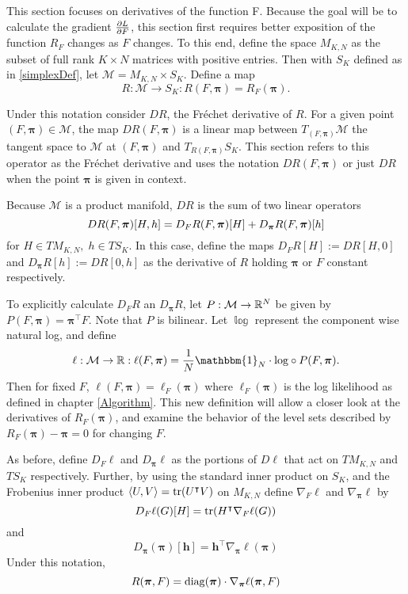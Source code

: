\label{sect:dRdPiANDdRdF}
This section focuses on derivatives of the function \Rpi F. Because the goal will be to calculate the gradient \( \pdv{L}{F} \), this section first requires better exposition of the function \( R_F \) changes as \( F \) changes. To this end, define the space $M_{K,N}$ as the subset of full rank $K\times N$ matrices with positive entries.  Then with $S_K$ defined as in \ref{simplexDef}, let $\mathcal{M}=M_{K,N}\times S_K$. Define a map
\begin{equation}\label{manifoldResp}
R:\mathcal{M}\rightarrow S_K:R(F,\bm\pi) = R_F(\bm\pi).
\end{equation}

Under this notation consider $DR$, the Fr\'{e}chet derivative of $R$.  For a given point $(F,\bm\pi)\in \mathcal{M}$, the map $DR(F,\bm\pi)$ is a linear map between $T_{(F,\bm\pi)}\mathcal{M}$ the tangent space to $\mathcal{M}$ at $(F,\bm\pi)$ and $T_{R(F,\bm\pi)}S_K$.  This section refers to this operator as the Fr\'{e}chet derivative and uses the notation $DR(F,\bm\pi)$ or just $DR$ when the point \( \bm\pi \) is given in context.

Because $\mathcal{M}$ is a product manifold, $DR$ is the sum of two linear operators
\begin{equation*}
DR(F,\bm\pi)[H,h] = D_FR(F,\bm\pi)[H] + D_{\bm\pi}R(F,\bm\pi)[h]  \\
\end{equation*}
for \( H\in TM_{K,N},\; h\in TS_K\). In this case, define the maps $D_FR[H]:=DR[H,0]$ and $D_{\bm\pi}R[h]:=DR[0,h]$ as the derivative of $R$ holding $\bm\pi$ or $F$ constant respectively.

To explicitly calculate \( D_FR \) an \( D_{\bm\pi}R \), let $P:\mathcal{M}\rightarrow \mathbb R^{N}$ be given by $P(F,\bm\pi)=\bm\pi^{\intercal}F$.  Note that $P$ is bilinear. Let $\mathbb{\log}$ represent the component wise natural log, and define 
\[\ell:\mathcal{M}\rightarrow \R:\ell(F,\bm\pi)=\frac{1}{N}\mathbbm{1}_N\cdot\mathbb{\log}\circ P(F,\bm\pi).\]
Then for fixed $F$, $\ell(F,\bm\pi)=\ell_F(\bm\pi)$ where $\ell_F(\bm\pi)$ is the log likelihood as defined in chapter \ref{Algorithm}.  This new definition will allow a closer look at the derivatives of $R_F(\bm\pi)$, and examine the behavior of the level sets described by $R_F(\bm\pi)-\bm\pi=0$ for changing $F$.

As before, define $D_F\ell$ and $D_{\bm\pi}\ell$ as the portions of $D\ell$ that act on $TM_{K,N}$ and $TS_K$ respectively.  Further, by using the standard inner product on $S_K$, and the Frobenius inner product $\langle U,V\rangle=\operatorname{tr}(U^{\intercal}V)$ on $M_{K,N}$ define $\nabla_F\ell$ and $\nabla_{\bm\pi}\ell$ by
\[D_F\ell(G)[H]=\operatorname{tr}(H^{\intercal}\nabla_F\ell(G))\]
and
\begin{equation}\label{gradEll}
D_{\bm\pi}(\bm \pi)[\bm h]=\bm h^{\intercal}\nabla_{\bm\pi}\ell(\bm\pi)
\end{equation}
Under this notation, 
\begin{equation}\label{rGradDef}
R(\bm\pi,F)=\operatorname{diag}(\bm\pi)\cdot\nabla_{\bm\pi}\ell(\bm\pi,F)
\end{equation}


